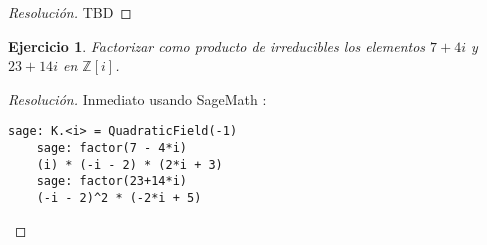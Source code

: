 \documentclass[a4paper,11pt]{article}
\newcommand{\Zm}[1]{\ensuremath{\mathbb{Z}[#1]}}
\newtheorem*{ej}{Ejercicio}
\begin{document}
\begin{proof}[Resoluci\'on]
TBD
\end{proof}

\begin{ej} 
Factorizar como producto de irreducibles los elementos $7 + 4i$ y $23 + 14i$ en \Zm{i}.
\end{ej}

\begin{proof}[Resoluci\'on]
Inmediato usando SageMath \smiley:

\begin{center}
\begin{minipage}{6.8cm}
    \begin{Verbatim}[frame=single,fontsize=\footnotesize]
    sage: K.<i> = QuadraticField(-1)
    sage: factor(7 - 4*i)
    (i) * (-i - 2) * (2*i + 3)
    sage: factor(23+14*i)
    (-i - 2)^2 * (-2*i + 5)    
    \end{Verbatim}
\end{minipage}
  \end{center}

\end{proof}
\end{document}
